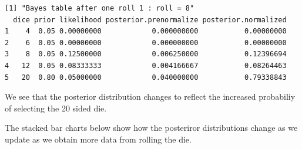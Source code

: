 \documentclass[a5paper,11pt]{article}
\begin{document}
\begin{lstlisting}
[1] "Bayes table after one roll 1 : roll = 8"
  dice prior likelihood posterior.prenormalize posterior.normalized
1    4  0.05 0.00000000            0.000000000           0.00000000
2    6  0.05 0.00000000            0.000000000           0.00000000
3    8  0.05 0.12500000            0.006250000           0.12396694
4   12  0.05 0.08333333            0.004166667           0.08264463
5   20  0.80 0.05000000            0.040000000           0.79338843
\end{lstlisting}

We see that the posterior distribution changes to reflect the increased
probabiliy of selecting the 20 sided die.

The stacked bar charts below show how the posteriror distributions change
as we update as we obtain more data from rolling the die.
\end{document}
